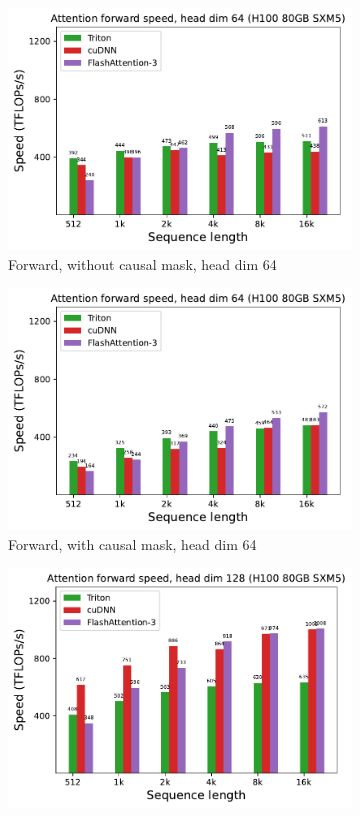 \begin{figure}[ht]
  \centering
  \begin{subfigure}{.5\textwidth}
    \centering
    \includegraphics[width=.95\linewidth]{figs/flash3_h100_fp8_causal_False_hdim_64_fwd_speed.pdf}
    \caption{Forward, without causal mask, head dim 64}
  \end{subfigure}%
  \begin{subfigure}{.5\textwidth}
    \centering
    \includegraphics[width=.95\linewidth]{figs/flash3_h100_fp8_causal_True_hdim_64_fwd_speed.pdf}
    \caption{Forward, with causal mask, head dim 64}
  \end{subfigure}
  \begin{subfigure}{.5\textwidth}
    \centering
    \includegraphics[width=.95\linewidth]{figs/flash3_h100_fp8_causal_False_hdim_128_fwd_speed.pdf}

\end{subfigure}
\end{figure}
